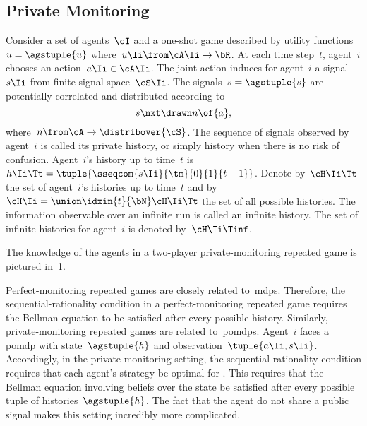 \subsection{Private Monitoring}
\label{sec:private_monitoring}

Consider a set of agents~\(\cI\) and a one-shot game described by utility functions~\(u = \agstuple{u}\) where~\(u\Ii \from \cA\Ii \to \bR \).
At each time step~\(t\), agent~\(i\) chooses an action~\(a\Ii \in \cA\Ii\).
The joint action induces for agent~\(i\) a signal~\(s\Ii\) from finite signal space~\(\cS\Ii\).
The signals~\(s = \agstuple{s}\) are potentially correlated and distributed according to
\[
s\nxt \drawn n \of{a},
\]
where~\(n \from \cA \to \distribover{\cS}\).
The sequence of signals observed by agent~\(i\) is called its private history, or simply history when there is no risk of confusion.
Agent~\(i\)'s history up to time~\(t\) is~\(h\Ii\Tt = \tuple{\sseqcom{s\Ii}{\tm}{0}{1}{t-1}}\).
Denote by~\(\cH\Ii\Tt\) the set of agent~\(i\)'s histories up to time~\(t\) and by~\(\cH\Ii = \union\idxin{t}{\bN} \cH\Ii\Tt\) the set of all possible histories.
The information observable over an infinite run is called an infinite history.
The set of infinite histories for agent~\(i\) is denoted by~\(\cH\Ii\Tinf\).

The knowledge of the agents in a two-player private-monitoring repeated game is pictured in~\cref{fig:agent_knowledge_private-monitoring_repeated_game}.

\begin{figure}[htp]
\centering
{}
\label{fig:agent_knowledge_private-monitoring_repeated_game}
\end{figure}

Perfect-monitoring repeated games are closely related to~\acp{mdp}.
Therefore, the sequential-rationality condition in a perfect-monitoring repeated game requires the Bellman equation to be satisfied after every possible history.
Similarly, private-monitoring repeated games are related to~\acp{pomdp}.
Agent~\(i\) faces a \ac{pomdp} with state~\(\agstuple{h}\) and observation~\(\tuple{a\Ii, s\Ii}\).
Accordingly, in the private-monitoring setting, the sequential-rationality condition requires that each agent's strategy be optimal for .
This requires that the Bellman equation involving beliefs over the state be satisfied after every possible tuple of histories~\(\agstuple{h}\).
The fact that the agent do not share a public signal makes this setting incredibly more complicated.

